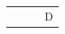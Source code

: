 \documentclass{article}
\begin{document}
\begin{NiceTabular}{c|cc|c}
 & & & D \\
\end{NiceTabular}
\end{document}
